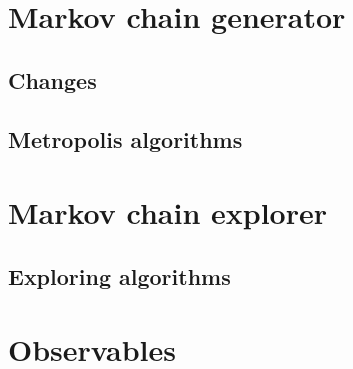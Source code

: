 \documentclass[a4paper, 12pt]{article}
\def\buildMode{buildmissing}
\begin{document}
    \begin{landscape}
    \section{Markov chain generator}

        \subsection{Changes}
        \begin{figure}[htb]
            \centering
            
            \caption{}
        \end{figure}
        \clearpage

        \subsection{Metropolis algorithms}
        \begin{figure}[htb]
            \centering
            
            \caption{}
        \end{figure}
        \clearpage

    \section{Markov chain explorer}

        \subsection{Exploring algorithms}
        \begin{figure}[htb]
            \centering
            
            \caption{}
        \end{figure}
        \clearpage

    \section{Observables}
        \begin{figure}[htb]
            \centering
            
            \caption{}
        \end{figure}
        \clearpage


\end{landscape}
\end{document}
